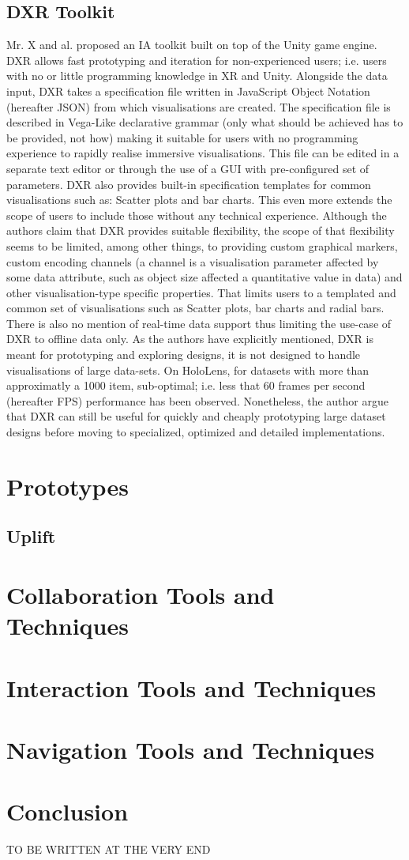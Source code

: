 \documentclass{vgtc}                          %
\begin{document}
\subsection{DXR Toolkit}
Mr. X and al. proposed an IA toolkit built on top of the Unity game engine.
DXR allows fast prototyping and iteration for non-experienced users; i.e.
users with no or little programming knowledge in XR and Unity.
Alongside the data input, DXR takes a specification file written in JavaScript
Object Notation (hereafter JSON) from which visualisations are created.
The specification file is described in Vega-Like declarative grammar
(only what should be achieved has to be provided, not how) making it suitable
for users with no programming experience to rapidly realise immersive
visualisations. This file can be edited in a separate text editor or through
the use of a GUI with pre-configured set of parameters. DXR also provides
built-in specification templates for common visualisations such as: Scatter
plots and bar charts. This even more extends the scope of users to include
those without any technical experience. Although the authors claim that DXR
provides suitable flexibility, the scope of that flexibility seems to be
limited, among other things, to providing custom graphical markers, custom
encoding channels (a channel is a visualisation parameter affected by some
data attribute, such as object size affected a quantitative value in data)
and other visualisation-type specific properties. That limits users to a
templated and common set of visualisations such as Scatter plots, bar charts
and radial bars. There is also no mention of real-time data support thus
limiting the use-case of DXR to offline data only. As the authors have
explicitly mentioned, DXR is meant for prototyping and exploring designs, it
is not designed to handle visualisations of large data-sets. On HoloLens,
for datasets with more than approximatly a 1000 item, sub-optimal; i.e. less
that 60 frames per second (hereafter FPS) performance has been observed.
Nonetheless, the author argue that DXR can still be useful for quickly and
cheaply prototyping large dataset designs before moving to specialized,
optimized and detailed implementations.

\section{Prototypes}
\subsection{Uplift}

\section{Collaboration Tools and Techniques}
\section{Interaction Tools and Techniques}
\section{Navigation Tools and Techniques}

\section{Conclusion}
TO BE WRITTEN AT THE VERY END

\printbibliography
\end{document}
